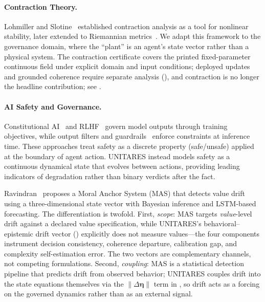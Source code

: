 \documentclass[11pt,twocolumn]{article}
\newcommand{\norm}[1]{\left\lVert #1 \right\rVert}
\begin{document}
\paragraph{Contraction Theory.}
Lohmiller and Slotine~\cite{lohmiller1998contraction} established
contraction analysis as a tool for nonlinear stability, later
extended to Riemannian metrics~\cite{slotine2003modular}. We adapt
this framework to the governance domain, where the ``plant'' is
an agent's state vector rather than a physical system. The
contraction certificate covers the printed fixed-parameter continuous
field under explicit domain and input conditions; deployed updates
and grounded coherence require separate analysis
(),
and contraction is no longer the headline contribution; see
.

\paragraph{AI Safety and Governance.}
Constitutional AI~\cite{bai2022constitutional} and
RLHF~\cite{ouyang2022training} govern model outputs through training
objectives, while output filters and guardrails~\cite{rebedea2023nemo}
enforce constraints at inference time. These approaches treat safety as
a discrete property (safe/unsafe) applied at the boundary of agent
action. UNITARES instead models safety as a continuous dynamical
state that evolves between actions, providing leading indicators of
degradation rather than binary verdicts after the fact.

Ravindran~\cite{ravindran2025moral} proposes a Moral Anchor System
(MAS) that detects value drift using a three-dimensional state
vector with Bayesian inference and LSTM-based forecasting. The
differentiation is twofold. First, \emph{scope}: MAS targets
\emph{value}-level drift against a declared value specification,
while UNITARES's behavioral--epistemic drift vector
() explicitly does not measure values---the
four components instrument decision consistency, coherence departure,
calibration gap, and complexity self-estimation error. The two
vectors are complementary channels, not competing formulations.
Second, \emph{coupling}: MAS is a statistical detection pipeline
that predicts drift from observed behavior; UNITARES couples drift
into the state equations themselves via the $\norm{\Delta\bm\eta}$
term in , so drift acts as a forcing on the
governed dynamics rather than as an external signal.
\end{document}
